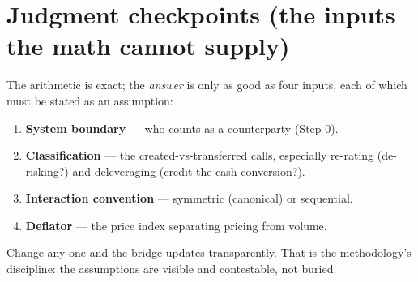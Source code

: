 \documentclass[11pt]{article}
\begin{document}
\section{Judgment checkpoints (the inputs the math cannot supply)}
The arithmetic is exact; the \emph{answer} is only as good as four inputs, each of which must
be stated as an assumption:
\begin{enumerate}
  \item \textbf{System boundary} --- who counts as a counterparty (Step 0).
  \item \textbf{Classification} --- the created-vs-transferred calls, especially re-rating
  (de-risking?) and deleveraging (credit the cash conversion?).
  \item \textbf{Interaction convention} --- symmetric (canonical) or sequential.
  \item \textbf{Deflator} --- the price index separating pricing from volume.
\end{enumerate}
Change any one and the bridge updates transparently. That is the methodology's discipline:
the assumptions are visible and contestable, not buried.

\end{document}
